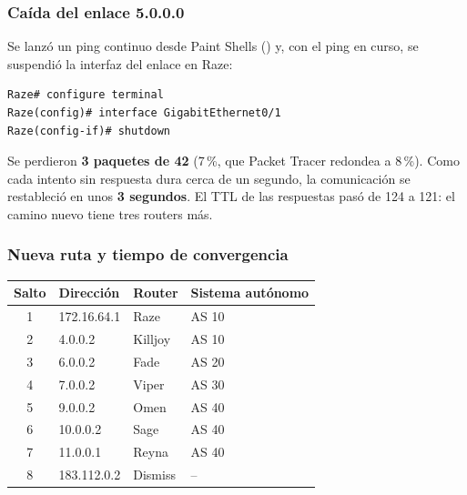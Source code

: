 \subsubsection*{Caída del enlace 5.0.0.0}

Se lanzó un ping continuo desde Paint Shells () y, con el ping en curso, se suspendió la interfaz del enlace en Raze:

\begin{lstlisting}
Raze# configure terminal
Raze(config)# interface GigabitEthernet0/1
Raze(config-if)# shutdown
\end{lstlisting}


Se perdieron \textbf{3 paquetes de 42} (7\,\%, que Packet Tracer redondea a 8\,\%). Como cada intento sin respuesta dura cerca de un segundo, la comunicación se restableció en unos \textbf{3 segundos}. El TTL de las respuestas pasó de 124 a 121: el camino nuevo tiene tres routers más.

\subsubsection*{Nueva ruta y tiempo de convergencia}


\begin{center}\small
\begin{tabular}{@{}clll@{}}
\toprule
Salto & Dirección & Router & Sistema autónomo \\
\midrule
1 & 172.16.64.1 & Raze & AS 10 \\
2 & 4.0.0.2 & Killjoy & AS 10 \\
3 & 6.0.0.2 & Fade & AS 20 \\
4 & 7.0.0.2 & Viper & AS 30 \\
5 & 9.0.0.2 & Omen & AS 40 \\
6 & 10.0.0.2 & Sage & AS 40 \\
7 & 11.0.0.1 & Reyna & AS 40 \\
8 & 183.112.0.2 & Dismiss & -- \\
\bottomrule
\end{tabular}
\end{center}

